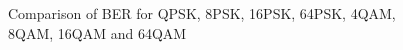 \begin{figure}[ht!]
    \begin{center}
        
        \caption{Comparison of BER for QPSK, 8PSK, 16PSK, 64PSK, 4QAM, 8QAM, 16QAM and 64QAM}
    \end{center}\label{fig:2}
\end{figure}